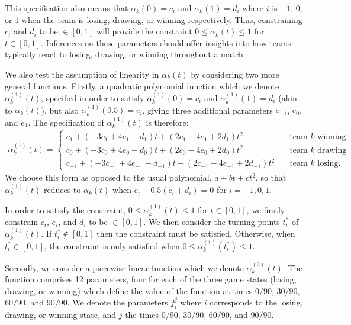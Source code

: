 This specification also means that \(\alpha_k(0) = c_i\) and \(\alpha_k(1) = d_i\) where \(i\) is \(-1\), \(0\), or
\(1\) when the team is losing, drawing, or winning respectively. Thus, constraining \(c_i\) and \(d_i\) to be \(\in [0,
1]\) will provide the constraint \(0 \leq \alpha_k(t) \leq 1\) for \(t \in [0, 1]\). Inferences on these parameters
should offer insights into how teams typically react to losing, drawing, or winning throughout a match.

We also test the assumption of linearity in \(\alpha_k(t)\) by considering two more general functions. Firstly, a
quadratic polynomial function which we denote \(\alpha^{(1)}_k(t)\), specified in order to satisfy \(\alpha^{(1)}_k(0) =
c_i\) and \(\alpha^{(1)}_k(1) = d_i\) (akin to \(\alpha_k(t)\)), but also \(\alpha^{(1)}_k(0.5) = e_i\), giving three
additional parameters \(e_{-1}\), \(e_0\), and \(e_1\). The specification of \(\alpha^{(1)}_k(t)\) is therefore:
\begin{align}
\alpha^{(1)}_k(t) = \left \{
\begin{array}{ll}
c_{1} + (-3c_{1} + 4e_{1} - d_{1})t + (2c_{1} - 4e_{1} +2d_{1})t^2        \quad &\text{team \(k\) winning} \\
c_{0} + (-3c_{0} + 4e_{0} - d_{0})t + (2c_{0} - 4e_{0} +2d_{0})t^2        \quad &\text{team \(k\) drawing} \\
c_{-1} + (-3c_{-1} + 4e_{-1} - d_{-1})t + (2c_{-1} - 4e_{-1} +2d_{-1})t^2 \quad &\text{team \(k\) losing}.
\end{array} \right.
\end{align}
We choose this form as opposed to the usual polynomial, \(a + bt + ct^2\), so that \(\alpha^{(1)}_k(t)\) reduces to
\(\alpha_k(t)\) when \(e_i - 0.5(c_i + d_i) = 0\) for \(i = -1, 0, 1\).

In order to satisfy the constraint, \(0 \leq \alpha^{(1)}_k(t) \leq 1\) for \(t \in [0, 1]\), we firstly constrain \(c_i\),
\(e_i\), and \(d_i\) to be \(\in [0, 1]\). We then consider the turning points \(t^*_i\) of \(\alpha^{(1)}_k(t)\). If
\(t^*_i \notin [0, 1]\) then the constraint must be satisfied. Otherwise, when \(t^*_i \in [0, 1]\), the constraint
is only satisfied when \(0 \leq \alpha^{(1)}_k(t^*_i) \leq 1\).

Secondly, we consider a piecewise linear function which we denote \(\alpha^{(2)}_k(t)\). The function comprises 12
parameters, four for each of the three game states (losing, drawing, or winning) which define the value of the function
at times \(0/90\), \(30/90\), \(60/90\), and \(90/90\). We denote the parameters \(f_i^j\) where  \(i\) corresponds to
the losing, drawing, or winning state, and \(j\) the times \(0/90\), \(30/90\), \(60/90\), and \(90/90\).

